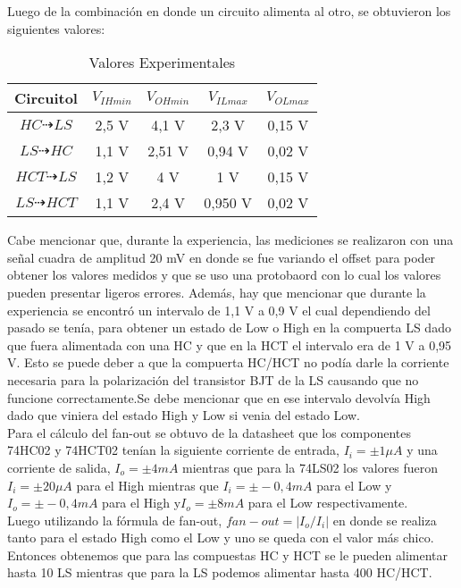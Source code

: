 Luego de la combinación  en donde un circuito alimenta al otro, se obtuvieron los siguientes valores:
\begin{center}
	\begin{table}[h!]
	\begin{center}
		\caption{Valores Experimentales}
			\begin{tabular}{|c|c|c|c|c|}
				\hline
				\textbf{Circuitol} & \textbf{$V_{IHmin}$} & \textbf{$V_{OHmin}$} & \textbf{$V_{ILmax}$}& \textbf{$V_{OLmax}$}\\
				\hline
				\textbf{$HC \dashrightarrow LS$} & 2,5 V & 4,1 V & 2,3 V & 0,15 V\\
				\hline
				\textbf{$LS \dashrightarrow HC$} & 1,1 V & 2,51 V & 0,94 V & 0,02 V\\
				\hline
				\textbf{$HCT \dashrightarrow LS$} & 1,2 V & 4 V & 1 V & 0,15 V\\
				\hline
				\textbf{$LS \dashrightarrow HCT$} & 1,1 V & 2,4 V & 0,950 V & 0,02 V\\
				\hline
			\end{tabular}
		\end{center}
	\end{table}
\end{center}
Cabe mencionar que, durante la experiencia, las mediciones se realizaron con una señal cuadra de amplitud 20 mV en donde se fue variando el offset para poder obtener los valores medidos y que se uso una protobaord con lo cual los valores pueden presentar ligeros errores. Además, hay que mencionar que durante la experiencia se encontró un intervalo de 1,1 V a 0,9 V el cual dependiendo del pasado se tenía, para obtener un estado de Low o High en la compuerta LS dado que fuera alimentada con una HC y que en la HCT el intervalo era de 1 V a 0,95 V. Esto se puede deber a que la compuerta HC/HCT no podía darle la corriente necesaria para la polarización del transistor BJT de la LS causando que no funcione correctamente.Se debe mencionar que en ese intervalo devolvía High dado que viniera del estado High y Low si venia del estado Low.\\
Para el cálculo del fan-out se obtuvo de la datasheet que los componentes 74HC02 y 74HCT02 tenían la siguiente corriente de entrada, $I_i= \pm 1 \mu A$ y una corriente de salida, $I_o= \pm 4 mA$ mientras que para la 74LS02 los valores fueron $I_i= \pm 20 \mu A$ para el High mientras que $I_i= \pm -0,4 mA$ para el Low y $I_o= \pm -0,4 mA$ para el High y$I_o= \pm 8 mA$ para el Low respectivamente.\\
Luego utilizando la fórmula de fan-out, $fan-out=|I_o/I_i|$ en donde se realiza tanto para el estado High como el Low y uno se queda con el valor más chico. Entonces obtenemos que para las compuestas HC y HCT se le pueden alimentar hasta 10 LS mientras que para la LS podemos alimentar hasta 400 HC/HCT.\\
